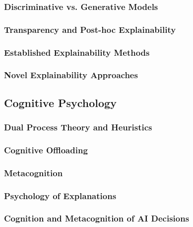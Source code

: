 \subsubsection{Discriminative vs. Generative Models} \label{sssec:disc_vs_gen}

\subsubsection{Transparency and Post-hoc Explainability} \label{sssec:transparency_posthoc}

\subsubsection{Established Explainability Methods} \label{sssec:established_methods}

\cite{Ribeiro2016}

\cite{Lundberg2017}

\subsubsection{Novel Explainability Approaches} \label{sssec:novel_approaches}

\cite{Martens2025}

\subsection{Cognitive Psychology} \label{ssec:cognitive_psychology}

\subsubsection{Dual Process Theory and Heuristics} \label{sssec:dual_process}

\cite{Kahnemann2011}

\subsubsection{Cognitive Offloading} \label{sssec:cognitive_offloading}

\subsubsection{Metacognition} \label{sssec:metacognition}

\subsubsection{Psychology of Explanations} \label{sssec:psychology_explanations}

\cite{Miller2019}

\subsubsection{Cognition and Metacognition of AI Decisions} \label{sssec:cognition_metacognition_ai}

\cite{Jussupow2021}

\cite{Shin2021}

